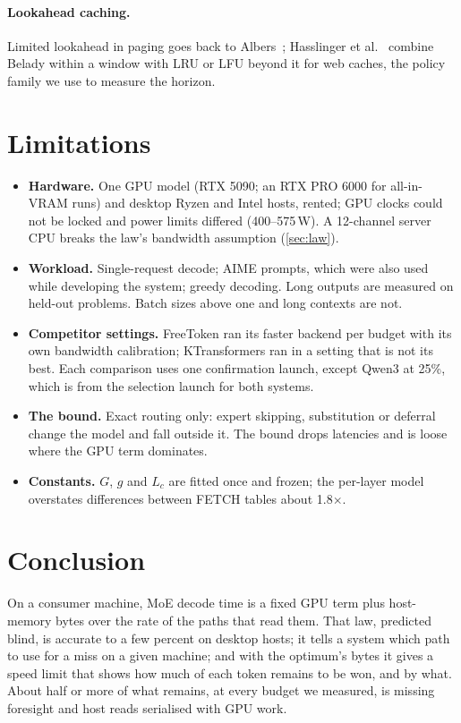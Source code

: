 \documentclass[10pt,twocolumn]{article}
\begin{document}
\paragraph{Lookahead caching.} Limited lookahead in paging goes back to Albers~\cite{albers1997lookahead}; Hasslinger et
al.~\cite{hasslinger2018} combine Belady within a window with LRU or LFU beyond it for web caches, the policy family we
use to measure the horizon.

\section{Limitations}\label{sec:limits}
\begin{itemize}\setlength\itemsep{1pt}
\item \textbf{Hardware.} One GPU model (RTX 5090; an RTX PRO 6000 for all-in-VRAM runs) and desktop Ryzen and Intel
hosts, rented; GPU clocks could not be locked and power limits differed (400--575\,W). A 12-channel server CPU breaks
the law's bandwidth assumption (\cref{sec:law}).
\item \textbf{Workload.} Single-request decode; AIME prompts, which were also used while developing the system;
greedy decoding. Long outputs are measured on held-out problems. Batch sizes above one and long contexts are not.
\item \textbf{Competitor settings.} FreeToken ran its faster backend per budget with its own bandwidth calibration;
KTransformers ran in a setting that is not its best. Each comparison uses one confirmation launch, except Qwen3 at
25\%, which is from the selection launch for both systems.
\item \textbf{The bound.} Exact routing only: expert skipping, substitution or deferral change the model and fall
outside it. The bound drops latencies and is loose where the GPU term dominates.
\item \textbf{Constants.} $G$, $g$ and $L_c$ are fitted once and frozen; the per-layer model overstates differences
between FETCH tables about 1.8$\times$.
\end{itemize}

\section{Conclusion}
On a consumer machine, MoE decode time is a fixed GPU term plus host-memory bytes over the rate of the paths that read
them. That law, predicted blind, is accurate to a few percent on desktop hosts; it tells a system which path to use
for a miss on a given machine; and with the optimum's bytes it gives a speed limit that shows how much of each token
remains to be won, and by what. About half or more of what remains, at every budget we measured, is missing foresight and
host reads serialised with GPU work.
\end{document}
